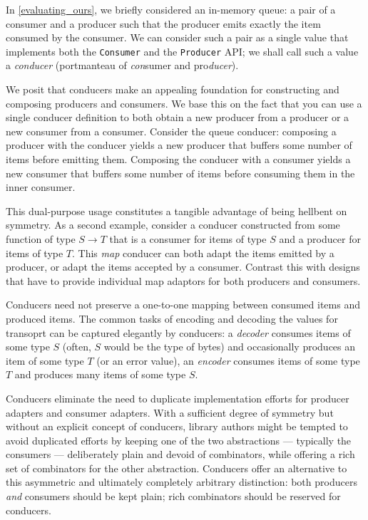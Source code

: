 \documentclass[sigplan,screen,10pt,anonymous,review]{acmart}
\begin{document}
In \cref{evaluating_ours}, we briefly considered an in-memory queue: a pair of a consumer and a producer such that the producer emits exactly the item consumed by the consumer. We can consider such a pair as a single value that implements both the \texttt{Consumer} and the \texttt{Producer} API; we shall call such a value a \textit{conducer} (portmanteau of \textit{con}sumer and pro\textit{ducer}).

We posit that conducers make an appealing foundation for constructing and composing producers and consumers. We base this on the fact that you can use a single conducer definition to both obtain a new producer from a producer or a new consumer from a consumer. Consider the queue conducer: composing a producer with the conducer yields a new producer that buffers some number of items before emitting them. Composing the conducer with a consumer yields a new consumer that buffers some number of items before consuming them in the inner consumer.

This dual-purpose usage constitutes a tangible advantage of being hellbent on symmetry. As a second example, consider a conducer constructed from some function of type $S \rightarrow T$ that is a consumer for items of type $S$ and a producer for items of type $T$. This \textit{map} conducer can both adapt the items emitted by a producer, or adapt the items accepted by a consumer. Contrast this with designs that have to provide individual map adaptors for both producers and consumers.

Conducers need not preserve a one-to-one mapping between consumed items and produced items. The common tasks of encoding and decoding the values for transoprt can be captured elegantly by conducers: a \textit{decoder} consumes items of some type $S$ (often, $S$ would be the type of bytes) and occasionally produces an item of some type $T$ (or an error value), an \textit{encoder} consumes items of some type $T$ and produces many items of some type $S$.

Conducers eliminate the need to duplicate implementation efforts for producer adapters and consumer adapters. With a sufficient degree of symmetry but without an explicit concept of conducers, library authors might be tempted to avoid duplicated efforts by keeping one of the two abstractions --- typically the consumers --- deliberately plain and devoid of combinators, while offering a rich set of combinators for the other abstraction. Conducers offer an alternative to this asymmetric and ultimately completely arbitrary distinction: both producers \textit{and} consumers should be kept plain; rich combinators should be reserved for conducers.
\end{document}
